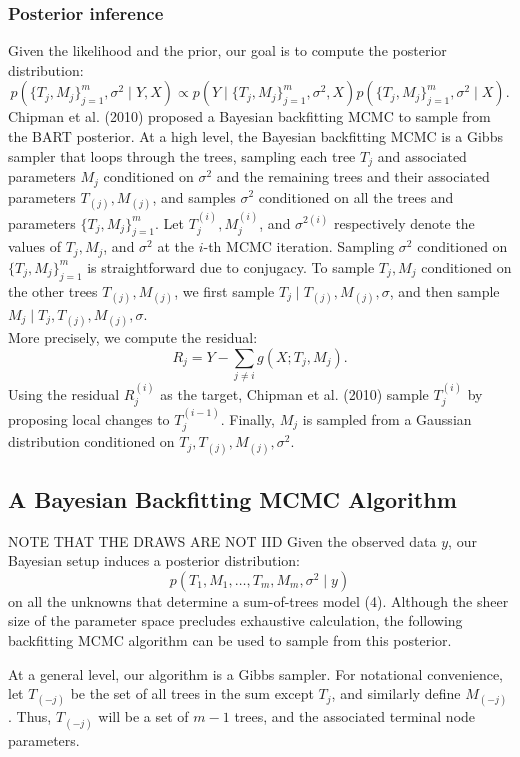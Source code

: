 \documentclass[a4paper,11pt]{article}
\begin{document}
\subsubsection{Posterior inference}

Given the likelihood and the prior, our goal is to compute the posterior distribution:
\[
p\left( \{T_j, M_j \}_{j=1}^{m}, \sigma^2 \mid Y, X\right) \propto p\left(Y \mid \{ T_j, M_j \}_{j=1}^{m}, \sigma^2, X\right) p\left(\{T_j, M_j \}_{j=1}^{m}, \sigma^2 \mid X\right).
\]
Chipman et al. (2010) proposed a Bayesian backfitting MCMC to sample from the BART posterior. At a high level, the Bayesian backfitting MCMC is a Gibbs sampler that loops through the trees, sampling each tree \( T_j \) and associated parameters \( M_j \) conditioned on \( \sigma^2 \) and the remaining trees and their associated parameters \( T_{(j)}, M_{(j)}  \), and samples \( \sigma^2 \) conditioned on all the trees and parameters \( \{ T_j, M_j \}_{j=1}^{m} \).
Let \( T_j^{(i)}, M_j^{(i)} \), and \( \sigma^{2(i)} \) respectively denote the values of \( T_j, M_j \), and \( \sigma^2 \) at the \( i \)-th MCMC iteration. Sampling \( \sigma^2 \) conditioned on \( \{T_j, M_j \}_{j=1}^{m} \) is straightforward due to conjugacy.
To sample \( T_j, M_j \) conditioned on the other trees \( T_{(j)}, M_{(j)}  \), we first sample $T_j \mid T_{(j)}, M_{(j)}  , \sigma$, and then sample $M_j \mid T_j, T_{(j)}, M_{(j)},  \sigma$.
\\More precisely, we compute the residual:
\[
R_j = Y - \sum_{j \neq i} g(X; T_j, M_j).
\]
Using the residual \( R_j^{(i)} \) as the target, Chipman et al. (2010) sample \( T_j^{(i)} \) by proposing local changes to \( T_j^{(i-1)} \).
Finally, \( M_j \) is sampled from a Gaussian distribution conditioned on \( T_j, T_{(j)}, M_{(j)}  , \sigma^2 \).

\subsection{ A Bayesian Backfitting MCMC Algorithm}
NOTE THAT THE DRAWS ARE NOT IID
Given the observed data \( y \), our Bayesian setup induces a posterior distribution:
\[
p\left(T_1, M_1, \ldots, T_m, M_m, \sigma^2 \mid y\right)
\]
on all the unknowns that determine a sum-of-trees model (4). Although the sheer size of the parameter space precludes exhaustive calculation, the following backfitting MCMC algorithm can be used to sample from this posterior. 

At a general level, our algorithm is a Gibbs sampler. For notational convenience, let \( T_{(-j)} \) be the set of all trees in the sum except \( T_j \), and similarly define \( M_{(-j)} \). Thus, \( T_{(-j)} \) will be a set of \( m - 1 \) trees, and the associated terminal node parameters. 
\end{document}
